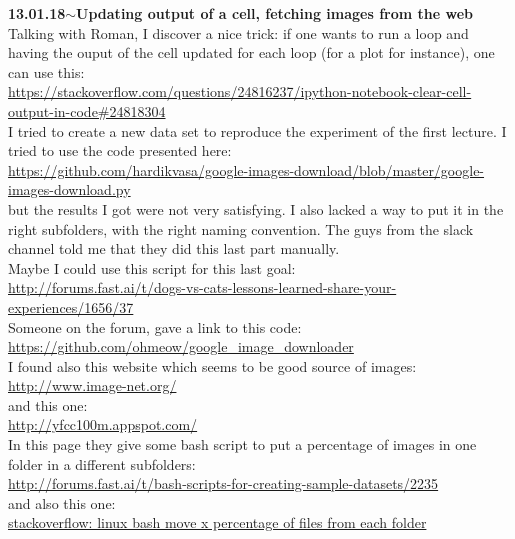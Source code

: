 \documentclass[11pt,a4paper]{article}
\newenvironment{loggentry}[2]%
{\noindent\textbf{#1}\hspace{1cm}$\mathbf{\sim}$\text{ }\textbf{#2}\\}{\vspace{0.5cm}}
\begin{document}
\begin{loggentry}{13.01.18}{Updating output of a cell, fetching images from the web}
Talking with Roman, I discover a nice trick: if one wants to run a loop and having the ouput of the cell updated for each loop (for a plot for instance), one can use this:\\
\url{https://stackoverflow.com/questions/24816237/ipython-notebook-clear-cell-output-in-code#24818304}\\
I tried to create a new data set to reproduce the experiment of the first lecture. I tried to use the code presented here:\\
\url{https://github.com/hardikvasa/google-images-download/blob/master/google-images-download.py}\\
but the results I got were not very satisfying. I also lacked a way to put it in the right subfolders, with the right naming convention. The guys from the slack channel told me that they did this last part manually.\\
Maybe I could use this script for this last goal:\\
\url{http://forums.fast.ai/t/dogs-vs-cats-lessons-learned-share-your-experiences/1656/37}\\
Someone on the forum, gave a link to this code:\\
\url{https://github.com/ohmeow/google_image_downloader}\\
I found also this website which seems to be good source of images:\\
\url{http://www.image-net.org/}\\
and this one:\\
\url{http://yfcc100m.appspot.com/}\\
In this page they give some bash script to put a percentage of images in one folder in a different subfolders:\\
\url{http://forums.fast.ai/t/bash-scripts-for-creating-sample-datasets/2235}\\
and also this one:\\
\href{https://stackoverflow.com/questions/36476326/linux-bash-move-x-percentage-of-files-from-each-folder}{stackoverflow: linux bash move x percentage of files from each folder}\\
\end{loggentry}
\end{document}
